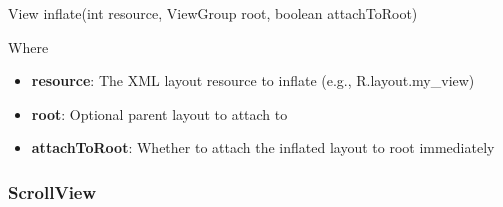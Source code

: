 \documentclass{report}
\begin{document}
\begin{itemize}
\begin{javacode}
                View inflate(int resource, ViewGroup root, boolean attachToRoot)
            \end{javacode}
            \bigbreak \noindent 
            Where 
            \begin{itemize}
                \item \textbf{resource}:	The XML layout resource to inflate (e.g., R.layout.my\_view)
                \item \textbf{root}:	Optional parent layout to attach to
                \item \textbf{attachToRoot}:	Whether to attach the inflated layout to root immediately
            \end{itemize}
    \end{itemize}

    \pagebreak 
    \subsubsection{ScrollView}
\end{document}
